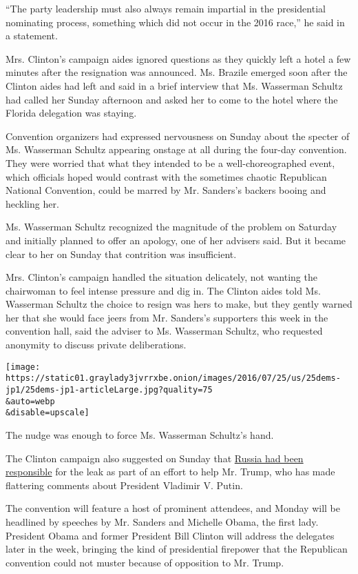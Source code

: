``The party leadership must also always remain impartial in the
presidential nominating process, something which did not occur in the
2016 race,'' he said in a statement.

Mrs. Clinton's campaign aides ignored questions as they quickly left a
hotel a few minutes after the resignation was announced. Ms. Brazile
emerged soon after the Clinton aides had left and said in a brief
interview that Ms. Wasserman Schultz had called her Sunday afternoon and
asked her to come to the hotel where the Florida delegation was staying.

Convention organizers had expressed nervousness on Sunday about the
specter of Ms. Wasserman Schultz appearing onstage at all during the
four-day convention. They were worried that what they intended to be a
well-choreographed event, which officials hoped would contrast with the
sometimes chaotic Republican National Convention, could be marred by Mr.
Sanders's backers booing and heckling her.

Ms. Wasserman Schultz recognized the magnitude of the problem on
Saturday and initially planned to offer an apology, one of her advisers
said. But it became clear to her on Sunday that contrition was
insufficient.

Mrs. Clinton's campaign handled the situation delicately, not wanting
the chairwoman to feel intense pressure and dig in. The Clinton aides
told Ms. Wasserman Schultz the choice to resign was hers to make, but
they gently warned her that she would face jeers from Mr. Sanders's
supporters this week in the convention hall, said the adviser to Ms.
Wasserman Schultz, who requested anonymity to discuss private
deliberations.

\texttt{[image: https://static01.graylady3jvrrxbe.onion/images/2016/07/25/us/25dems-jp1/25dems-jp1-articleLarge.jpg?quality=75\\\&auto=webp\\\&disable=upscale]}

The nudge was enough to force Ms. Wasserman Schultz's hand.

The Clinton campaign also suggested on Sunday that
\href{http://www.nytimes3xbfgragh.onion/2016/07/25/us/politics/donald-trump-russia-emails.html}{Russia
had been responsible} for the leak as part of an effort to help Mr.
Trump, who has made flattering comments about President Vladimir V.
Putin.

The convention will feature a host of prominent attendees, and Monday
will be headlined by speeches by Mr. Sanders and Michelle Obama, the
first lady. President Obama and former President Bill Clinton will
address the delegates later in the week, bringing the kind of
presidential firepower that the Republican convention could not muster
because of opposition to Mr. Trump.

